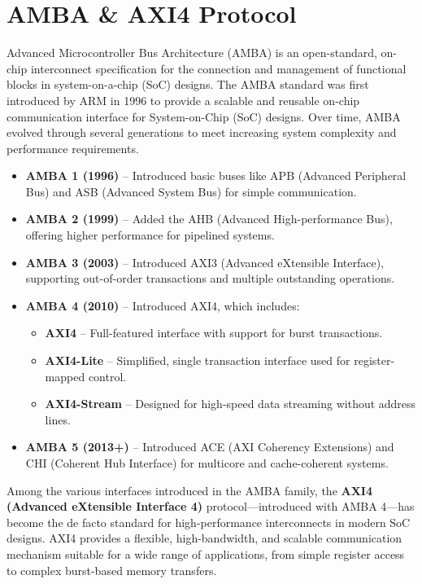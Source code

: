 \section{AMBA & AXI4 Protocol}

Advanced Microcontroller Bus Architecture (AMBA) is an open-standard, on-chip interconnect specification for the connection and management of functional blocks in system-on-a-chip (SoC) designs. The AMBA standard was first introduced by ARM in 1996 to provide a scalable and reusable on-chip communication interface for System-on-Chip (SoC) designs. Over time, AMBA evolved through several generations to meet increasing system complexity and performance requirements.

\begin{itemize}
    \item \textbf{AMBA 1 (1996)} – Introduced basic buses like APB (Advanced Peripheral Bus) and ASB (Advanced System Bus) for simple communication.
    \item \textbf{AMBA 2 (1999)} – Added the AHB (Advanced High-performance Bus), offering higher performance for pipelined systems.
    \item \textbf{AMBA 3 (2003)} – Introduced AXI3 (Advanced eXtensible Interface), supporting out-of-order transactions and multiple outstanding operations.
    \item \textbf{AMBA 4 (2010)} – Introduced AXI4, which includes:
        \begin{itemize}
            \item \textbf{AXI4} – Full-featured interface with support for burst transactions.
            \item \textbf{AXI4-Lite} – Simplified, single transaction interface used for register-mapped control.
            \item \textbf{AXI4-Stream} – Designed for high-speed data streaming without address lines.
        \end{itemize}
    \item \textbf{AMBA 5 (2013+)} – Introduced ACE (AXI Coherency Extensions) and CHI (Coherent Hub Interface) for multicore and cache-coherent systems.
\end{itemize}

Among the various interfaces introduced in the AMBA family, the \textbf{AXI4 (Advanced eXtensible Interface 4)} protocol—introduced with AMBA 4—has become the de facto standard for high-performance interconnects in modern SoC designs. AXI4 provides a flexible, high-bandwidth, and scalable communication mechanism suitable for a wide range of applications, from simple register access to complex burst-based memory transfers.

